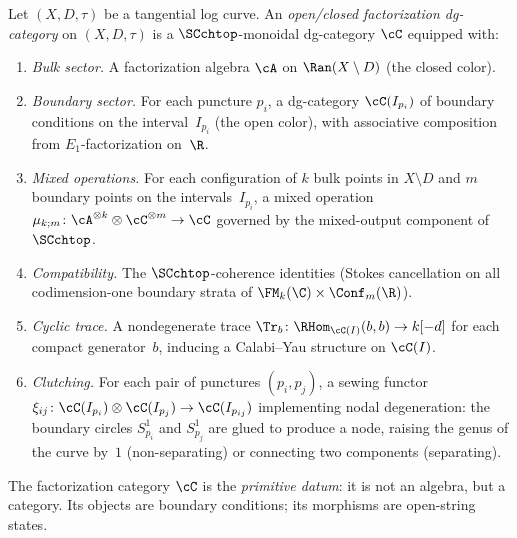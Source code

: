 \begin{definition}
\label{def:oc-fact-cat}
Let $(X, D, \tau)$ be a tangential log curve. An \emph{open/closed
factorization dg-category} on $(X, D, \tau)$ is a $\SCchtop$-monoidal
dg-category $\cC$ equipped with:
\begin{enumerate}[label=\textup{(\roman*)}]
\item \emph{Bulk sector.} A factorization algebra $\cA$ on
 $\Ran(X \setminus D)$ (the closed color).

\item \emph{Boundary sector.} For each puncture $p_i$, a
 dg-category $\cC(I_{p_i})$ of boundary conditions on the
 interval~$I_{p_i}$ (the open color), with associative
 composition from $E_1$-factorization on~$\R$.

\item \emph{Mixed operations.} For each configuration of $k$
 bulk points in $X \setminus D$ and $m$ boundary points on the
 intervals~$I_{p_i}$, a mixed operation
 $\mu_{k;m} \colon \cA^{\otimes k} \otimes
 \cC^{\otimes m} \to \cC$
 governed by the mixed-output component of $\SCchtop$.

\item \emph{Compatibility.} The $\SCchtop$-coherence
 identities (Stokes cancellation on all codimension-one
 boundary strata of $\FM_k(\C) \times \Conf_m(\R)$).

\item \emph{Cyclic trace.} A nondegenerate trace
 $\Tr_b \colon \RHom_{\cC(I)}(b,b) \to k[-d]$
 for each compact generator~$b$, inducing a Calabi--Yau
 structure on $\cC(I)$.

\item \emph{Clutching.} For each pair of punctures
 $(p_i, p_j)$, a sewing functor
 $\xi_{ij} \colon \cC(I_{p_i}) \otimes \cC(I_{p_j}) \to
 \cC(I_{p_{ij}})$
 implementing nodal degeneration: the boundary circles $S^1_{p_i}$
 and $S^1_{p_j}$ are glued to produce a node, raising the genus of
 the curve by~$1$ (non-separating) or connecting two components
 (separating).
\end{enumerate}
The factorization category $\cC$ is the \emph{primitive datum}: it
is not an algebra, but a category. Its objects are boundary
conditions; its morphisms are open-string states.
\end{definition}

